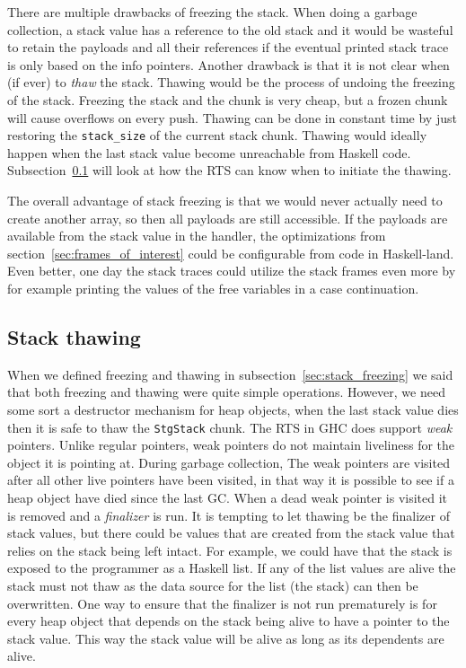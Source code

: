 There are multiple drawbacks of freezing the stack. When doing a garbage
collection, a stack value has a reference to the old stack and it would
be wasteful to retain the payloads and all their references if the
eventual printed stack trace is only based on the info pointers. Another
drawback is that it is not clear when (if ever) to \emph{thaw} the
stack. Thawing would be the process of undoing the freezing of the
stack. Freezing the stack and the chunk is very cheap, but a frozen chunk
will cause overflows on every push. Thawing can be done in
constant time by just restoring the \texttt{stack\_size} of the current
stack chunk. Thawing would ideally happen when the last stack value
become unreachable from Haskell code. Subsection~\ref{sec:wait-free_thawing}
will look at how the RTS can know when to initiate the thawing.

The overall advantage of stack freezing is that we would never actually
need to create another array, so then all payloads are still accessible.
If the payloads are available from the stack value in the handler,
the optimizations from section~\ref{sec:frames_of_interest} could be
configurable from code in Haskell-land. Even better, one day the stack
traces could utilize the stack frames even more by for example printing
the values of the free variables in a case continuation.

\subsection{Stack thawing} \label{sec:wait-free_thawing}

When we defined freezing and thawing in subsection~\ref{sec:stack_freezing} we
said that both freezing and thawing were quite simple operations. However, we need
some sort a destructor mechanism for heap objects, when the last stack value dies
then it is safe to thaw the \texttt{StgStack} chunk.  The RTS in
GHC does support \emph{weak} pointers. Unlike regular pointers, weak pointers
do not maintain liveliness for the object it is pointing at. During garbage
collection, The weak pointers are visited after all other live pointers have
been visited, in that way it is possible to see if a heap object have died
since the last GC. When a dead weak pointer is visited it is removed and a
\emph{finalizer} is run. It is tempting to let thawing be the finalizer of
stack values, but there could be values that are
created from the stack value that relies on the stack being left intact.  For
example, we could have that the stack is exposed to the programmer as a Haskell
list.  If any of the list values are alive the stack must not thaw as the data source
for the list (the stack) can then be overwritten. One way to ensure that the
finalizer is not run prematurely is for every heap object that depends on the
stack being alive to have a pointer to the stack value. This way the stack
value will be alive as long as its dependents are alive.

